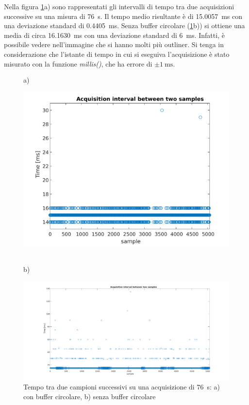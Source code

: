 Nella figura \ref{fig:time_interval}a) sono rappresentati gli intervalli di tempo tra due acquisizioni successive su una misura di \SI{76}{\second}. Il tempo medio risultante è di \SI{15.0057}{\milli\second} con una deviazione standard di \SI{0.4405}{\milli\second}. Senza buffer circolare (\Fig\ref{fig:time_interval}b)) si ottiene una media di circa \SI{16.1630}{\milli\second} con una deviazione standard di \SI{6}{\milli\second}. Infatti, è possibile vedere nell'immagine che si hanno molti più outliner.
Si tenga in considerazione che l'istante di tempo in cui si eseguiva l'acquisizione è stato misurato con la funzione \textit{millis()}, che ha errore di $\pm \SI{1}{\milli\second}$. 
\begin{figure}[tbh]
	\centering
	a)
	\begin{minipage}{.900\textwidth}
		\includegraphics[width=0.8\linewidth]{./ImageFiles/interval_time.pdf}
	\end{minipage}
	\\b)
	\begin{minipage}{.900\textwidth}
		\includegraphics[width=\linewidth]{./ImageFiles/interval_time_2}
	\end{minipage}
	\caption{Tempo tra due campioni successivi su una acquisizione di \SI{76}{\second}: a) con buffer circolare, b) senza buffer circolare}
	\label{fig:time_interval}
\end{figure}

